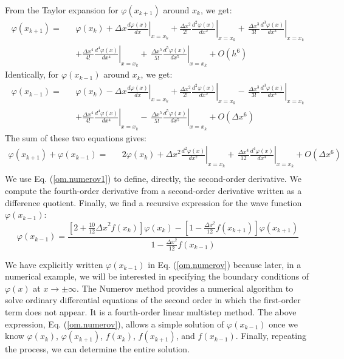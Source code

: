\documentclass[nofootinbib, secnumarabic, amsmath, nobibnotes,10pt,aps,pra]{revtex4-1}
\newcommand{\eref}[1]{Eq. (\ref{#1})}
\begin{document}
From the Taylor expansion for $\varphi(x_{k + 1})$ around $x_k$, we get:
\begin{eqnarray}
\varphi(x_{k + 1}) =&& \varphi(x_{k}) + \Delta x \left.\frac {d\varphi(x)}{dx}\right|_{x = x_k} + \frac{\Delta x^2}{2!} \left.\frac {d^2\varphi(x)}{dx^2}\right|_{x = x_k} +\, \left.\frac{\Delta x^3}{3!} \frac{d^3\varphi(x)}{dx^3}\right|_{x = x_k} \nonumber\\&&+ \frac{\Delta x^4}{4!} \left.\frac{d^4\varphi(x)}{dx^4}\right|_{x = x_k}+\, \frac{\Delta x^5}{5!} \left.\frac{d^5\varphi(x)}{dx^5}\right|_{x = x_k} + {O} (h^6)
\end{eqnarray}
Identically, for $\varphi(x_{k-1})$ around $x_k$, we get:
\begin{eqnarray}
\varphi(x_{k - 1}) =&& \varphi(x_{k}) - \Delta x \left.\frac {d\varphi(x)}{dx}\right|_{x = x_k} + \frac{\Delta x^2}{2!} \left. \frac {d^2\varphi(x)}{dx^2}\right|_{x = x_k}-\, \frac{\Delta x^3}{3!} \left.\frac{d^3\varphi(x)}{dx^3}\right|_{x = x_k}
 \nonumber\\ &&+ \frac{\Delta x^4}{4!} \left.\frac{d^4\varphi(x)}{dx^4}\right|_{x = x_k}-\, \frac{\Delta x^5}{5!} \left.\frac{d^5\varphi(x)}{dx^5}\right|_{x = x_k} + {O} (\Delta x^6)
\end{eqnarray}
The sum of these two equations gives:
\begin{eqnarray}
\varphi(x_{k + 1}) + \varphi(x_{k-1}) =&& 2\varphi(x_{k}) + {\Delta x^2} \left.\frac {d^2\varphi(x)}{dx^2}\right|_{x = x_k}+\, \frac{\Delta x^4}{12} \left.\frac {d^4\varphi(x)}{dx^4}\right|_{x = x_k} + {O} (\Delta x^6)\nonumber\\
\end{eqnarray}
We use \eref{om.numerov1} to define, directly, the second-order derivative. We compute the fourth-order derivative from a second-order derivative written as a difference  quotient. Finally, we find a recursive expression for the wave function $\varphi(x_{k-1})$:
\begin{equation}
\varphi(x_{k - 1}) = \frac{\left[2 + \frac{10}{12}{\Delta x}^{2}f(x_k) \right]\varphi(x_{k}) - \left[1 - \frac{{\Delta x}^{2}}{12}f(x_{k + 1}) \right]\varphi(x_{k + 1})}{1 - \frac{{\Delta x}^{2}}{12}f(x_{k - 1})}
\label{om.numerov}
\end{equation}

We have explicitly written $\varphi(x_{k - 1})$ in \eref{om.numerov}
because later, in a numerical example, we will be interested in
specifying the boundary conditions of $\varphi(x)$ at $x\rightarrow
\pm \infty$. The Numerov method \cite{om.numrov1,om.numrov2}
provides a numerical algorithm to solve ordinary differential
equations of the second order in which the first-order term does not
appear. It is a fourth-order linear multistep method. The above
expression, \eref{om.numerov}, allows a simple solution of
$\varphi(x_{k-1})$ once we know $\varphi(x_{k})$, $\varphi(x_{k +
1})$, $f(x_k)$, $f(x_{k + 1})$, and $f(x_{k-1})$. Finally, repeating
the process, we can determine the entire solution.
\end{document}

